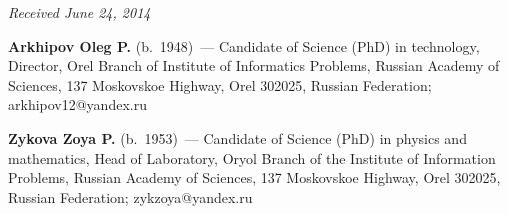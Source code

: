 \vspace*{-6pt}

\hfill{\small\textit{Received June 24, 2014}}

\vspace*{-18pt}

\Contr

\noindent
  \textbf{Arkhipov Oleg P.} (b.\ 1948)~--- Candidate of Science (PhD) in
technology, Director, Orel Branch of Institute of Informatics Problems, Russian
Academy of Sciences, 137 Moskovskoe Highway, Orel 302025, Russian
Federation; arkhipov12@yandex.ru

\vspace*{3pt}

\noindent
\textbf{Zykova Zoya P.} (b.\ 1953)~--- Candidate of Science (PhD) in physics
and mathematics, Head of Laboratory, Oryol Branch of the
Institute of
Information Problems, Russian Academy of Sciences,
137 Moskovskoe Highway, Orel 302025, Russian Federation; zykzoya@yandex.ru




\label{end\stat}

\renewcommand{\bibname}{\protect\rm Литература}